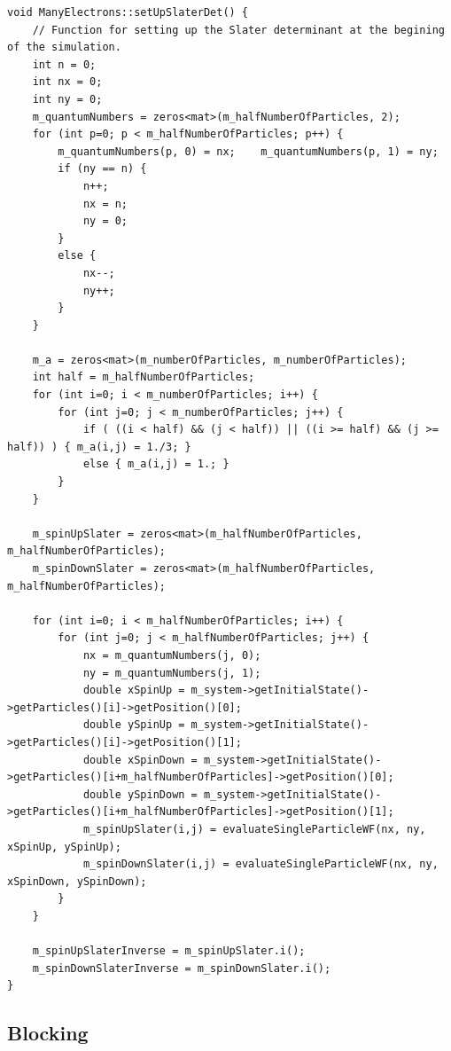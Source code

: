 \documentclass[../main.tex]{subfiles}
\begin{document}
\begin{lstlisting}[title={Setting up the (Split) Slater Determinant in C++}]
void ManyElectrons::setUpSlaterDet() {
    // Function for setting up the Slater determinant at the begining of the simulation.
    int n = 0;
    int nx = 0;
    int ny = 0;
    m_quantumNumbers = zeros<mat>(m_halfNumberOfParticles, 2);
    for (int p=0; p < m_halfNumberOfParticles; p++) {
        m_quantumNumbers(p, 0) = nx;    m_quantumNumbers(p, 1) = ny;
        if (ny == n) {
            n++;
            nx = n;
            ny = 0;
        }
        else {
            nx--;
            ny++;
        }
    }

    m_a = zeros<mat>(m_numberOfParticles, m_numberOfParticles);
    int half = m_halfNumberOfParticles;
    for (int i=0; i < m_numberOfParticles; i++) {
        for (int j=0; j < m_numberOfParticles; j++) {
            if ( ((i < half) && (j < half)) || ((i >= half) && (j >= half)) ) { m_a(i,j) = 1./3; }
            else { m_a(i,j) = 1.; }
        }
    }

    m_spinUpSlater = zeros<mat>(m_halfNumberOfParticles, m_halfNumberOfParticles);
    m_spinDownSlater = zeros<mat>(m_halfNumberOfParticles, m_halfNumberOfParticles);

    for (int i=0; i < m_halfNumberOfParticles; i++) {
        for (int j=0; j < m_halfNumberOfParticles; j++) {
            nx = m_quantumNumbers(j, 0);
            ny = m_quantumNumbers(j, 1);
            double xSpinUp = m_system->getInitialState()->getParticles()[i]->getPosition()[0];
            double ySpinUp = m_system->getInitialState()->getParticles()[i]->getPosition()[1];
            double xSpinDown = m_system->getInitialState()->getParticles()[i+m_halfNumberOfParticles]->getPosition()[0];
            double ySpinDown = m_system->getInitialState()->getParticles()[i+m_halfNumberOfParticles]->getPosition()[1];
            m_spinUpSlater(i,j) = evaluateSingleParticleWF(nx, ny, xSpinUp, ySpinUp);
            m_spinDownSlater(i,j) = evaluateSingleParticleWF(nx, ny, xSpinDown, ySpinDown);
        }
    }

    m_spinUpSlaterInverse = m_spinUpSlater.i();
    m_spinDownSlaterInverse = m_spinDownSlater.i();
}
\end{lstlisting}

\subsection{Blocking}
\end{document}
